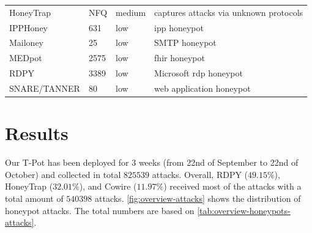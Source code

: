 \begin{table}
\begin{tabularx}{\linewidth}{l|XlX}
        HoneyTrap \cite{honeytrap2021}            & NFQ                                                                                                         & medium                     & captures attacks via unknown protocols                                               \\
        IPPHoney \cite{ipphoney2021}              & 631                                                                                                         & low                        & \ac{ipp} honeypot                                                                    \\
        Mailoney \cite{mailoney2021}              & 25                                                                                                          & low                        & SMTP honeypot                                                                        \\
        MEDpot \cite{medpot2021}                  & 2575                                                                                                        & low                        & \ac{fhir} honeypot                                                                   \\
        RDPY \cite{rdpy2021}                      & 3389                                                                                                        & low                        & Microsoft \ac{rdp} honeypot                                                          \\
        SNARE/TANNER \cite{snare2021}             & 80                                                                                                          & low                        & web application honeypot                                                             \\
        \bottomrule
    \end{tabularx}
    \label{tab:overview-honeypots}
\end{table}

\section{Results}
\label{sec:honeypots-heicloud}

Our T-Pot has been deployed for 3 weeks (from 22nd of September to 22nd of October) and collected in total $825539$ attacks.
Overall, RDPY ($49.15\%$), HoneyTrap ($32.01\%$), and Cowire ($11.97\%$) received most of the attacks with a total amount of $540398$ attacks.
\autoref{fig:overview-attacks} shows the distribution of honeypot attacks.
The total numbers are based on \autoref{tab:overview-honeypots-attacks}.


